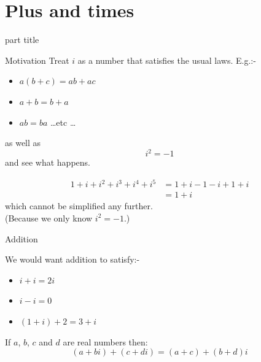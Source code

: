\documentclass{beamer}
\begin{document}
\section{Plus and times}

\begin{frame}
\begin{beamercolorbox}[sep=12pt,center]{part title}
\insertsection\par
\end{beamercolorbox}
\end{frame}

\begin{frame}{Motivation}
Treat $i$ as a number that satisfies the usual laws. E.g.:-
\begin{itemize}
	\item $a(b+c) = ab+ac$
	\item $a+b = b+a$
	\item $ab = ba$ \dots etc \dots
\end{itemize}
as well as
\begin{equation*}
i^2=-1
\end{equation*}
and see what happens.
\begin{example}
\begin{align*}
1+i+i^2+i^3+i^4+i^5 &= 1+i-1-i+1+i \\
&= 1+i
\end{align*}
which cannot be simplified any further.\\
(Because we only know $i^2=-1$.)
\end{example}
\end{frame}

\begin{frame}{Addition}
\begin{example}
We would want addition to satisfy:-
\begin{itemize}
	\item $i+i = 2i$
	\item $i-i = 0$
	\item $(1+i)+2 = 3+i$
\end{itemize}
\end{example}
\begin{definition}
If $a$, $b$, $c$ and $d$ are real numbers then:
	\begin{equation*}
	(a+bi)+(c+di) = (a+c)+(b+d)i
	\end{equation*}
\end{definition}
\end{frame}
\end{document}
